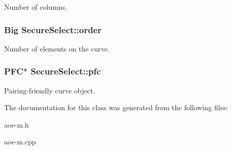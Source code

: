 Number of columns. \hypertarget{classSecureSelect_ac97b5a9177b47f64f49891feb67b69b2}{
\subsubsection[{order}]{\setlength{\rightskip}{0pt plus 5cm}Big Secure\-Select\-::order}}\label{classSecureSelect_ac97b5a9177b47f64f49891feb67b69b2}
Number of elements on the curve. \hypertarget{classSecureSelect_acd8fd34bdde543ca9711ac5e266a094d}{
\subsubsection[{pfc}]{\setlength{\rightskip}{0pt plus 5cm}P\-F\-C$\ast$ Secure\-Select\-::pfc}}\label{classSecureSelect_acd8fd34bdde543ca9711ac5e266a094d}
Pairing-\/friendly curve object. 

The documentation for this class was generated from the following files\-:\begin{DoxyCompactItemize}
\item 
aoe-\/m.\-h\item 
aoe-\/m.\-cpp\end{DoxyCompactItemize}

